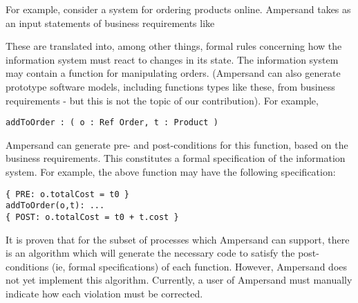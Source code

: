 \documentclass[12pt]{report}
\begin{document}
For example, consider a system for ordering products online. Ampersand takes as
an input statements of business requirements like
\begin{quotation}
\end{quotation}

These are translated into, among other things, formal rules concerning how the
information system must react to changes in its state. The information system
may contain a function for manipulating orders. (Ampersand can also generate
prototype software models, including functions types like these, from business
requirements - but this is not the topic of our contribution). For example,

\begin{verbatim}
addToOrder : ( o : Ref Order, t : Product )
\end{verbatim}

Ampersand can generate pre- and post-conditions for this function, based on the
business requirements. This constitutes a formal specification of the
information system. For example, the above function may have the following specification:

\begin{verbatim}
{ PRE: o.totalCost = t0 } 
addToOrder(o,t): ...
{ POST: o.totalCost = t0 + t.cost } 
\end{verbatim}

It is proven  that for the subset 
  of
processes which Ampersand can support, there is an algorithm which will generate
the necessary code to satisfy the post-conditions (ie, formal specifications) of
each function. However, Ampersand does not yet implement this
algorithm. Currently, a user of Ampersand must manually indicate how each
violation must be corrected.
\end{document}
